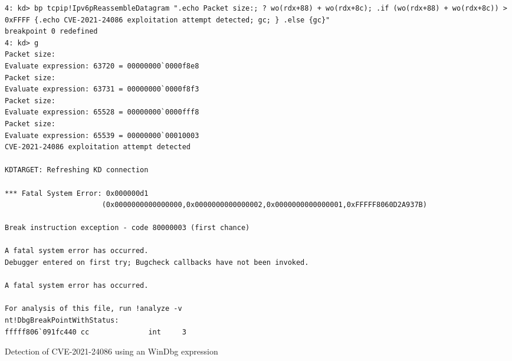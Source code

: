 \documentclass{report}
\begin{document}
\begin{listing}[H]
    \begin{verbatim}
4: kd> bp tcpip!Ipv6pReassembleDatagram ".echo Packet size:; ? wo(rdx+88) + wo(rdx+8c); .if (wo(rdx+88) + wo(rdx+8c)) > 0xFFFF {.echo CVE-2021-24086 exploitation attempt detected; gc; } .else {gc}"
breakpoint 0 redefined
4: kd> g
Packet size:
Evaluate expression: 63720 = 00000000`0000f8e8
Packet size:
Evaluate expression: 63731 = 00000000`0000f8f3
Packet size:
Evaluate expression: 65528 = 00000000`0000fff8
Packet size:
Evaluate expression: 65539 = 00000000`00010003
CVE-2021-24086 exploitation attempt detected

KDTARGET: Refreshing KD connection

*** Fatal System Error: 0x000000d1
                       (0x0000000000000000,0x0000000000000002,0x0000000000000001,0xFFFFF8060D2A937B)

Break instruction exception - code 80000003 (first chance)

A fatal system error has occurred.
Debugger entered on first try; Bugcheck callbacks have not been invoked.

A fatal system error has occurred.

For analysis of this file, run !analyze -v
nt!DbgBreakPointWithStatus:
fffff806`091fc440 cc              int     3
\end{verbatim}
\caption{Detection of CVE-2021-24086 using an WinDbg expression}
\label{listing:detection:hooking:windbg-bp-output}
\end{listing}
\end{document}
